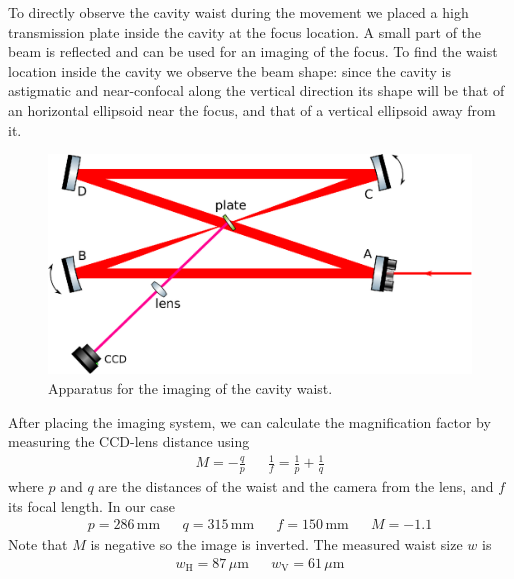 To directly observe the cavity waist during the movement we placed a high transmission plate inside the cavity at the focus location. A small part of the beam is reflected and can be used for an imaging of the focus. To find the waist location inside the cavity we observe the beam shape: since the cavity is astigmatic and near-confocal along the vertical direction its shape will be that of an horizontal ellipsoid near the focus, and that of a vertical ellipsoid away from it.

\begin{figure}
	\centering
	\includegraphics[width=0.8\linewidth]{images/focusima.eps}
	\caption{Apparatus for the imaging of the cavity waist.}
	\label{fig:focusima}
\end{figure}

After placing the imaging system, we can calculate the magnification factor by measuring the CCD-lens distance using
\begin{align}
	M = -\frac{q}{p} && \frac{1}{f} = \frac{1}{p} + \frac{1}{q}
\end{align}
where $p$ and $q$ are the distances of the waist and the camera from the lens, and $f$ its focal length. In our case
\begin{align*}
	p = 286\,\mathrm{mm} &&q = 315\,\mathrm{mm} &&f = 150\,\mathrm{mm} && M = -1.1
\end{align*}
Note that $M$ is negative so the image is inverted. The measured waist size $w$ is
\begin{align*}
	w_\mathrm{H} = 87\,\mu\mathrm{m} && w_\mathrm{V} = 61\,\mu\mathrm{m} 
\end{align*}

